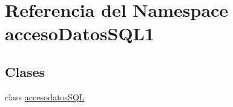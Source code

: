 \hypertarget{namespaceacceso_datos_s_q_l1}{}\section{Referencia del Namespace acceso\+Datos\+S\+Q\+L1}
\label{namespaceacceso_datos_s_q_l1}
\subsection*{Clases}
\begin{DoxyCompactItemize}
\item 
class \mbox{\hyperlink{classacceso_datos_s_q_l1_1_1accesodatos_s_q_l}{accesodatos\+S\+QL}}
\end{DoxyCompactItemize}
